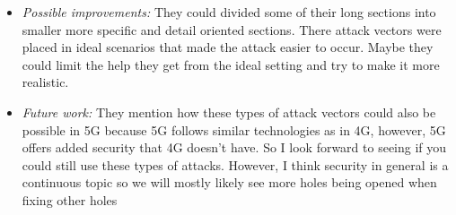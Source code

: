 \documentclass[letterpaper,twocolumn,10pt]{article}
\begin{document}
\begin{itemize}
\item {\it Possible improvements:} 
They could divided some of their long sections into smaller more specific and detail oriented sections. There
attack vectors were placed in ideal scenarios that made the attack easier to occur. Maybe they could limit
the help they get from the ideal setting and try to make it more realistic. 

\item {\it Future work:} 
They mention how these types of attack vectors could also be possible in 5G because 5G follows similar 
technologies as in 4G, however, 5G offers added security that 4G doesn't have. So I look forward to seeing 
if you could still use these types of attacks. However, I think security in general is a continuous topic so we will 
mostly likely see more holes being opened when fixing other holes

\end{itemize}

{
  \small 
  
  
}
\end{document}
